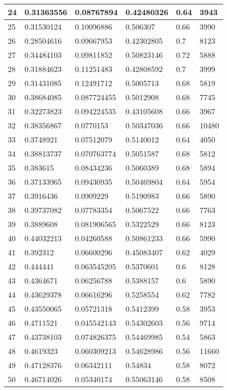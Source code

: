 \begin{longtable}{|l|l|l|l|l|l|}
24 & 0.31363556 & 0.08767894 & 0.42480326 & 0.64 & 3943 \\ \hline 
25 & 0.31530124 & 0.10096886 & 0.506307 & 0.66 & 3990 \\ \hline 
26 & 0.28504616 & 0.09667953 & 0.42302805 & 0.7 & 8123 \\ \hline 
27 & 0.34484103 & 0.09811852 & 0.50823146 & 0.72 & 5888 \\ \hline 
28 & 0.31884623 & 0.11251483 & 0.42808592 & 0.7 & 3999 \\ \hline 
29 & 0.31431085 & 0.12491712 & 0.5005713 & 0.68 & 5819 \\ \hline 
30 & 0.38684085 & 0.087724455 & 0.5012908 & 0.68 & 7745 \\ \hline 
31 & 0.32273823 & 0.094224535 & 0.43105608 & 0.66 & 3967 \\ \hline 
32 & 0.38356867 & 0.0770153 & 0.50347036 & 0.66 & 10480 \\ \hline 
33 & 0.3748921 & 0.07512079 & 0.5140012 & 0.64 & 4050 \\ \hline 
34 & 0.38813737 & 0.070763774 & 0.5051587 & 0.68 & 5812 \\ \hline 
35 & 0.383615 & 0.08434236 & 0.5060389 & 0.68 & 5894 \\ \hline 
36 & 0.37133965 & 0.09430935 & 0.50469804 & 0.64 & 5954 \\ \hline 
37 & 0.3916436 & 0.0909229 & 0.5190983 & 0.66 & 5890 \\ \hline 
38 & 0.39737082 & 0.07783354 & 0.5067522 & 0.66 & 7763 \\ \hline 
39 & 0.3889608 & 0.081906565 & 0.5322529 & 0.66 & 8123 \\ \hline 
40 & 0.44032213 & 0.04260588 & 0.50861233 & 0.66 & 5990 \\ \hline 
41 & 0.392312 & 0.06600296 & 0.45083407 & 0.62 & 4029 \\ \hline 
42 & 0.444441 & 0.063545205 & 0.5370601 & 0.6 & 8128 \\ \hline 
43 & 0.4364671 & 0.06256788 & 0.5388157 & 0.6 & 5890 \\ \hline 
44 & 0.43629378 & 0.06616296 & 0.5258554 & 0.62 & 7782 \\ \hline 
45 & 0.43550065 & 0.05721318 & 0.5412399 & 0.58 & 3953 \\ \hline 
46 & 0.4711521 & 0.045542143 & 0.54302603 & 0.56 & 9714 \\ \hline 
47 & 0.43738103 & 0.074826375 & 0.54469985 & 0.54 & 5863 \\ \hline 
48 & 0.4619323 & 0.060309213 & 0.54628986 & 0.56 & 11660 \\ \hline 
49 & 0.47128376 & 0.06342111 & 0.54834 & 0.58 & 8072 \\ \hline 
50 & 0.46714026 & 0.05340174 & 0.55063146 & 0.58 & 8508 \\ \hline 
\end{longtable}